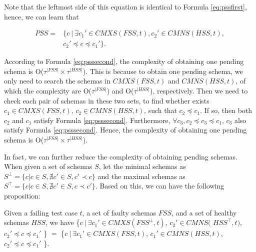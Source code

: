 \documentclass{sig-alternate-05-2015}
\begin{document}
{Note that the leftmost side of this equation is identical to Formula \ref{eq:pssfirst}, hence, we can learn that



\begin{equation}\label{eq:psssecond}
\begin{aligned}
PSS = & \{ c\ |\ \exists c_{1}' \in CMXS(FSS, t), c_{2}' \in CMNS(HSS, t), \\
    & c_{2}' \preceq c \preceq c_{1}' \}.
\end{aligned}
\end{equation}

According to Formula \ref{eq:psssecond}, the complexity of obtaining one pending schema is O($ \tau^{|FSS|} \times \tau^{|HSS|}$). This is because to obtain one pending schema, we only need to search the schemas in $CMXS(FSS, t)$ and $CMNS(HSS, t)$, of which the complexity are O($\tau^{|FSS|}$) and O($\tau^{|HSS|}$), respectively. Then we need to check each pair of schemas in these two sets, to find whether exists $c_{1} \in CMXS(FSS, t)$, $c_{2} \in CMNS(HSS, t)$, such that $c_{2} \preceq c_{1}$. If so, then both $c_{2}$ and $c_{1}$ satisfy Formula \ref{eq:psssecond}. Furthermore, $\forall c_{3}, c_{2} \preceq c_{3} \preceq c_{1}$, $c_{3}$ also satisfy Formula \ref{eq:psssecond}. Hence, the complexity of obtaining one pending schema is O($\tau^{|FSS|} \times \tau^{|HSS|}$).

In fact, we can further reduce the complexity of obtaining pending schemas. When given a set of schemas $S$, let the minimal schemas as $S^{\bot } = \{ c | c \in S, \nexists c' \in S, c' \prec c \}$ and the maximal schemas as $S^{\top } = \{ c | c \in S, \nexists c' \in S, c \prec c' \}$. Based on this, we can have the following proposition:

\begin{proposition}\label{pro:identicialPending}
Given a failing test case $t$, a set of faulty schemas $FSS$, and a set of healthy schemas $HSS$, we have \{$ c\ |\ \exists c_{1}' \in CMXS(FSS^{\bot}, t)$, $ c_{2}' \in CMNS($ $HSS^{\top}, t)$, $c_{2}' \preceq c \preceq c_{1}'$ \} $=$  \{$ c\ |\ \exists c_{1}' \in CMXS(FSS, t)$, $c_{1}' \in CMNS(HSS, t)$, $c_{2}' \preceq c \preceq c_{1}'$ \}.
\end{proposition}

}
\end{document}
